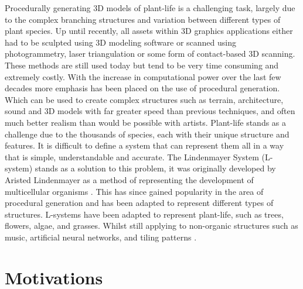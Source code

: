 \lettrine[lines=3]{P}{}rocedurally generating 3D models of plant-life is a challenging task, largely due to the complex branching structures and variation between different types of plant species. Up until recently, all assets within 3D graphics applications either had to be sculpted using 3D modeling software or scanned using photogrammetry, laser triangulation or some form of contact-based 3D scanning. These methods are still used today but tend to be very time consuming and extremely costly. With the increase in computational power over the last few decades more emphasis has been placed on the use of procedural generation. Which can be used to create complex structures such as terrain, architecture, sound and 3D models with far greater speed than previous techniques, and often much better realism than would be possible with artists. Plant-life stands as a challenge due to the thousands of species, each with their unique structure and features. It is difficult to define a system that can represent them all in a way that is simple, understandable and accurate. The Lindenmayer System (L-system) stands as a solution to this problem, it was originally developed by Aristed Lindenmayer as a method of representing the development of multicellular organisms \cite{lindenmayer1968mathematical}. This has since gained popularity in the area of procedural generation and has been adapted to represent different types of structures. L-systems have been adapted to represent plant-life, such as trees, flowers, algae, and grasses. Whilst still applying to non-organic structures such as music, artificial neural networks, and tiling patterns \cite{Prusinkiewicz1989}.\\



\section{Motivations}

